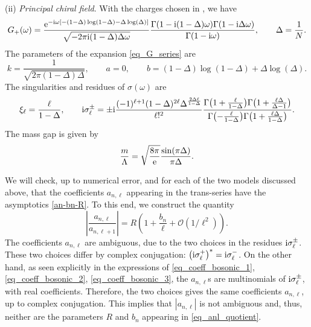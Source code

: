 \documentclass[a4paper,11pt]{article}
\theoremstyle{definition}
\newcommand{\re}{{\rm e}}
\newcommand{\ri}{{\rm i}}
\begin{document}
(ii) \textit{Principal chiral field}. With the charges chosen in \cite{pcf}, we have
\begin{equation}
G_+(\omega)=\frac{\re^{- \ri \omega  [-(1-\Delta) \log (1-\Delta)-\Delta  \log (\Delta )]}}{\sqrt{-2 \pi\ri (1-\Delta ) \Delta \omega } }\frac{\Gamma (1-\ri (1-\Delta ) \omega ) \Gamma (1-\ri \Delta  \omega ) }{\Gamma (1-\ri \omega )}, \qquad \Delta = \frac{1}{N}.
\end{equation}
The parameters of the expansion \eqref{eq_G_series} are
\begin{equation}
k = \frac{1}{\sqrt{2\pi (1-\Delta)\Delta}}, \qquad a = 0, \qquad b = (1-\Delta ) \log (1-\Delta )+\Delta  \log (\Delta ).
\end{equation}
The singularities and residues of $\sigma(\omega)$ are
\begin{equation}
\xi_\ell = \frac{\ell}{1-\Delta}, \qquad \ri\sigma_\ell^\pm = \pm\ri \frac{(-1)^{\ell+1} (1-\Delta )^{2 \ell} \Delta ^{\frac{2 \Delta  \ell}{1-\Delta}} }{\ell!^2} \frac{\Gamma \bigl(1+\frac{\ell}{1-\Delta }\bigr) \Gamma \bigl(1+\frac{\ell \Delta }{\Delta -1}\bigr)}{\Gamma \bigl(-\frac{\ell}{1-\Delta}\bigr) \Gamma \bigl(1+\frac{\ell \Delta }{1-\Delta }\bigr)}.
\end{equation}
The mass gap is given by \cite{pcf}
\begin{equation}
\frac{m}{\Lambda} = \sqrt{\frac{8 \pi }{\re}} \frac{\sin (\pi  \Delta )}{\pi  \Delta }.
\end{equation}

We will check, up to numerical error, and for each of the two models discussed above, that the coefficients $a_{n,\ell}$ appearing in the trans-series have the asymptotics \eqref{an-bn-R}. To this end, we construct the quantity
%
\begin{equation}
\left| \frac{a_{n,\ell}}{a_{n,\ell+1}} \right| = R \left( 1 + \frac{b_n}{\ell} + \mathcal{O}(1/\ell^2) \right).
\label{eq_anl_quotient}
\end{equation}
%
The coefficients $a_{n,\ell}$ are ambiguous, due to the two choices in the residues $\ri\sigma_\ell^\pm$. These two choices differ by complex conjugation: $\left( \ri\sigma_\ell^+ \right)^ *=\ri \sigma_\ell^-$. On the other hand, as seen explicitly in the expressions of \eqref{eq_coeff_bosonic_1}, \eqref{eq_coeff_bosonic_2}, \eqref{eq_coeff_bosonic_3}, the $a_{n,\ell}$s are multinomials of $\ri\sigma_\ell^\pm$, with real coefficients. Therefore, 
the two choices gives the same coefficients $a_{n, \ell}$, up to complex conjugation. This implies that $|a_{n,\ell}|$ is not ambiguous and, thus, neither are the parameters $R$ and $b_n$ appearing in \eqref{eq_anl_quotient}.
\end{document}
